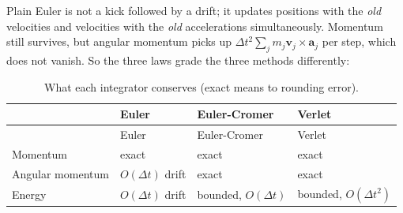 \documentclass[
  10.5pt,
  letterpaper,
]{scrbook}
\theoremstyle{plain}
\theoremstyle{remark}
\begin{document}
Plain Euler is not a kick followed by a drift; it updates positions with
the \emph{old} velocities and velocities with the \emph{old}
accelerations simultaneously. Momentum still survives, but angular
momentum picks up \(\Delta t^2\sum_j m_j\mathbf{v}_j\times\mathbf{a}_j\)
per step, which does not vanish. So the three laws grade the three
methods differently:

\begin{longtable}[]{@{}
  >{\raggedright\arraybackslash}p{}
  >{\raggedright\arraybackslash}p{}
  >{\raggedright\arraybackslash}p{}
  >{\raggedright\arraybackslash}p{}@{}}
\caption{What each integrator conserves (exact means to rounding
error).}\label{tbl-conservation}\tabularnewline
\toprule\noalign{}
\begin{minipage}[b]{\linewidth}\raggedright
\end{minipage} & \begin{minipage}[b]{\linewidth}\raggedright
Euler
\end{minipage} & \begin{minipage}[b]{\linewidth}\raggedright
Euler-Cromer
\end{minipage} & \begin{minipage}[b]{\linewidth}\raggedright
Verlet
\end{minipage} \\
\midrule\noalign{}
\endfirsthead
\toprule\noalign{}
\begin{minipage}[b]{\linewidth}\raggedright
\end{minipage} & \begin{minipage}[b]{\linewidth}\raggedright
Euler
\end{minipage} & \begin{minipage}[b]{\linewidth}\raggedright
Euler-Cromer
\end{minipage} & \begin{minipage}[b]{\linewidth}\raggedright
Verlet
\end{minipage} \\
\midrule\noalign{}
\endhead
\bottomrule\noalign{}
\endlastfoot
Momentum & exact & exact & exact \\
Angular momentum & \(O(\Delta t)\) drift & exact & exact \\
Energy & \(O(\Delta t)\) drift & bounded, \(O(\Delta t)\) & bounded,
\(O(\Delta t^2)\) \\
\end{longtable}
\end{document}
